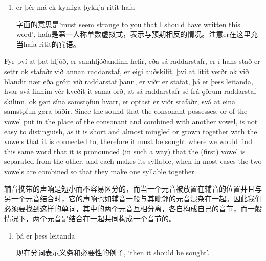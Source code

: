 \begin{grammar*}{}
    \begin{enumerate}[leftmargin=*]
        \item er þér má ek kynliga þykkja ritit hafa

              字面的意思是`must seem strange to you that I should have written this word',  hafa是第一人称单数虚拟式，表示与预期相反的情况。注意er在这里充当hafa ritit的宾语。
    \end{enumerate}
\end{grammar*}
\begin{paracol}{2}
    Fyr því at þat hljóð, er samhljóðandinn hefir, eða sá raddarstafr, er í hans stað er settr ok stafaðr við annan raddarstaf, er eigi auðskilit, því at lítit verðr ok við blandit nær eða gróit við raddarstaf þann, er viðr er stafat, þá er þess leitanda, hvar svá finnim vér kveðit it sama orð, at sá raddarstafr sé frá ǫðrum raddarstaf skilinn, ok gøri sína samstǫfun hvarr, er optast er viðr stafaðr, svá at eina samstǫfun gøra báðir.
    \switchcolumn
    Since the sound that the consonant possesses, or of the vowel put in the place of the consonant and combined with another vowel, is not easy to distinguish, as it is short and almost mingled or grown together with the vowels that it is connected to, therefore it must be sought where we would find this same word that it is pronounced (in such a way) that the (first) vowel is separated from the other, and each makes its syllable, when in most cases the two vowels are combined so that they make one syllable together.
\end{paracol}
\begin{translation*}{}
    辅音携带的声响是短小而不容易区分的，而当一个元音被放置在辅音的位置并且与另一个元音结合时，它的声响也如辅音一般与其毗邻的元音混杂在一起。因此我们必须要找到这样的单词，其中的两个元音互相分离，各自构成自己的音节，而一般情况下，两个元音是结合在一起共同构成一个音节的。
\end{translation*}
\begin{grammar*}{}
    \begin{enumerate}[leftmargin=*]
        \item þá er þess leitanda

              现在分词表示义务和必要性的例子, `then it should be sought'.
    \end{enumerate}
\end{grammar*}
